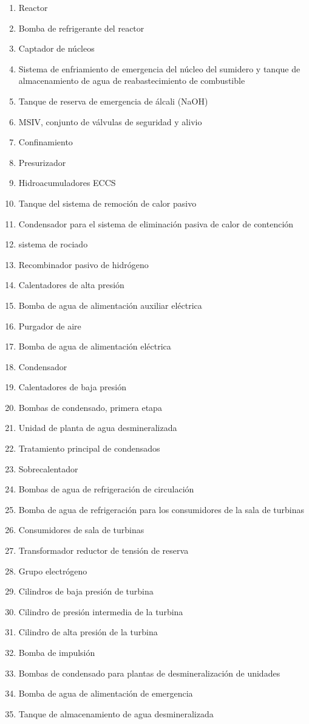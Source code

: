 \documentclass[]{article}
\begin{document}
\begin{multicols}{2}
\begin{enumerate}
		\item Reactor
		\item Bomba de refrigerante del reactor
		\item Captador de núcleos
		\item Sistema de enfriamiento de emergencia del núcleo del sumidero y tanque de almacenamiento de agua de reabastecimiento de combustible
		\item Tanque de reserva de emergencia de álcali (NaOH)
		\item MSIV, conjunto de válvulas de seguridad y alivio
		\item Confinamiento
		\item Presurizador
		\item Hidroacumuladores ECCS
		\item Tanque del sistema de remoción de calor pasivo
		\item Condensador para el sistema de eliminación pasiva de calor de contención
		\item sistema de rociado
		\item Recombinador pasivo de hidrógeno
		\item Calentadores de alta presión
		\item Bomba de agua de alimentación auxiliar eléctrica
		\item Purgador de aire
		\item Bomba de agua de alimentación eléctrica
		\item Condensador
		\item Calentadores de baja presión
		\item Bombas de condensado, primera etapa
		\item Unidad de planta de agua desmineralizada
		\item Tratamiento principal de condensados
		\item Sobrecalentador
		\item Bombas de agua de refrigeración de circulación
		\item Bomba de agua de refrigeración para los consumidores de la sala de turbinas
		\item Consumidores de sala de turbinas
		\item Transformador reductor de tensión de reserva
		\item Grupo electrógeno
		\item Cilindros de baja presión de turbina
		\item Cilindro de presión intermedia de la turbina
		\item Cilindro de alta presión de la turbina
		\item Bomba de impulsión
		\item Bombas de condensado para plantas de desmineralización de unidades
		\item Bomba de agua de alimentación de emergencia
		\item Tanque de almacenamiento de agua desmineralizada
	\end{enumerate}
\end{multicols}
\end{document}
